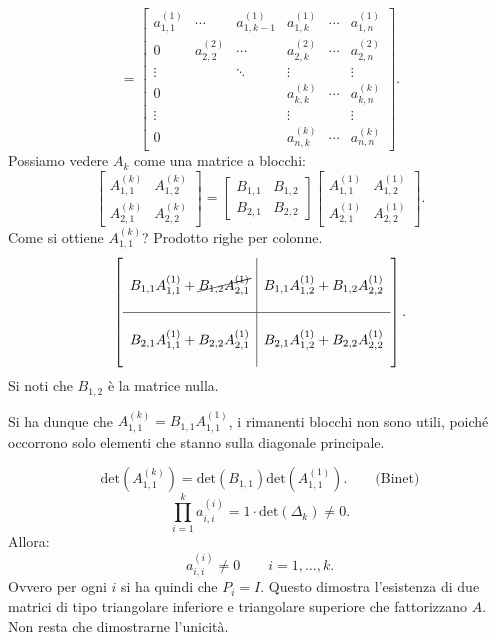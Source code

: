 \begin{dimo}
\begin{itemize}
\[
= \left[
\begin{array}{cccccc}
a_{1,1}^{(1)} &\cdots       &a_{1,k-1}^{(1)} &a_{1,k}^{(1)} &\cdots &a_{1,n}^{(1)}\\
0           & a_{2,2}^{(2)} &\cdots        &a_{2,k}^{(2)} &\cdots &a_{2,n}^{(2)}\\
\vdots      &             &\ddots        &\vdots      &       &\vdots\\
0           &             &              &a_{k,k}^{(k)} &\cdots &a_{k,n}^{(k)}\\
\vdots      &             &              &\vdots      &       &\vdots \\
0           &             &              &a_{n,k}^{(k)} &\cdots &a_{n,n}^{(k)}
\end{array} \right].
\]
Possiamo vedere $A_k$ come una matrice a blocchi:
\[
\left[
\begin{array}{c|c}
A_{1,1}^{(k)} & A_{1,2}^{(k)} \\
\hline
A_{2,1}^{(k)} & A_{2,2}^{(k)}
\end{array}
\right] =
\left[
\begin{array}{c|c}
B_{1,1}^{\ } & B_{1,2} \\
\hline
B_{2,1}^{\ } & B_{2,2}
\end{array}
\right]
\left[
\begin{array}{c|c}
A_{1,1}^{(1)} & A_{1,2}^{(1)} \\
\hline
A_{2,1}^{(1)} & A_{2,2}^{(1)}
\end{array}
\right].
\]
Come si ottiene $A_{1,1}^{(k)}$? Prodotto righe per colonne.
\[
\left[
\begin{array}{c|c}
\\
  B_{1,1}A_{1,1}^{(1)} + \cancel{B_{1,2}A_{2,1}^{(1)}}
& B_{1,1}A_{1,2}^{(1)} + B_{1,2}A_{2,2}^{(1)} \\
\\
\hline
\\
  B_{2,1}A_{1,1}^{(1)} + B_{2,2}A_{2,1}^{(1)}
& B_{2,1}A_{1,2}^{(1)} + B_{2,2}A_{2,2}^{(1)} \\
&
\end{array}
\right].
\]
Si noti che $B_{1,2}$ è la matrice nulla.

Si ha dunque che $A_{1,1}^{(k)} = B_{1,1}A_{1,1}^{(1)}$, i rimanenti blocchi non
sono utili, poiché occorrono solo elementi che stanno sulla diagonale
principale.

\[\textrm{det}\left(A_{1,1}^{(k)}\right)
= \textrm{det}(B_{1,1})\textrm{det}\left(A_{1,1}^{(1)}\right).
\qquad \textrm{(Binet)}\]
\[
\prod_{i = 1}^{k}a_{i,i}^{(i)} = 1 \cdot \textrm{det}(\Delta_k) \neq 0.
\]
Allora:
\[a_{i,i}^{(i)} \neq 0 \qquad i = 1,\ldots , k.\]
Ovvero per ogni $i$ si ha quindi che $P_i = I$. Questo dimostra l'esistenza
di due matrici di tipo triangolare inferiore e triangolare superiore che
fattorizzano $A$. Non resta che dimostrarne l'unicità.
\end{itemize}


\end{dimo}
